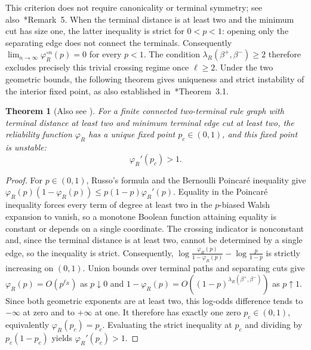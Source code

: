 \documentclass[scheme=plain,11pt]{ctexart}
\newtheorem{theorem}{Theorem}[section]
\theoremstyle{definition}
\theoremstyle{remark}
\begin{document}
This criterion does not require canonicality or terminal symmetry; see also~\cite{alves2026percolation}*{Remark~5}.
When the terminal distance is at least two and the minimum cut has size one, the latter inequality is strict for $0<p<1$: opening only the separating edge does not connect the terminals.
Consequently $\displaystyle\lim_{n\to\infty}\varphi_R^{\circ n}(p)=0$ for every $p<1$.
The condition $\lambda_R(\beta^+,\beta^-)\ge2$ therefore excludes precisely this trivial crossing regime once $\ell\ge2$.
Under the two geometric bounds, the following theorem gives uniqueness and strict instability of the interior fixed point, as also established in~\cite{alves2026percolation}*{Theorem~3.1}.

\begin{theorem}[Also see \cite{alves2026percolation}]
\label{thm:unique-unstable-critical-point}
For a finite connected two-terminal rule graph with terminal distance at least two and minimum terminal edge cut at least two, the reliability function $\varphi_R$ has a unique fixed point $p_c\in(0,1)$, and this fixed point is unstable:
\[
    \varphi_R'(p_c)>1.
\]
\end{theorem}

\begin{proof}
For $p\in(0,1)$, Russo's formula and the Bernoulli Poincar\'e inequality give $\varphi_R(p)(1-\varphi_R(p))\le p(1-p)\varphi_R'(p)$. Equality in the Poincar\'e inequality forces every term of degree at least two in the $p$-biased Walsh expansion to vanish, so a monotone Boolean function attaining equality is constant or depends on a single coordinate. The crossing indicator is nonconstant and, since the terminal distance is at least two, cannot be determined by a single edge, so the inequality is strict. Consequently, $\log\frac{\varphi_R(p)}{1-\varphi_R(p)}-\log\frac{p}{1-p}$ is strictly increasing on $(0,1)$. Union bounds over terminal paths and separating cuts give $\varphi_R(p)=O(p^{\ell_R})$ as $p\downarrow0$ and $1-\varphi_R(p)=O((1-p)^{\lambda_R(\beta^+,\beta^-)})$ as $p\uparrow1$. Since both geometric exponents are at least two, this log-odds difference tends to $-\infty$ at zero and to $+\infty$ at one. It therefore has exactly one zero $p_c\in(0,1)$, equivalently $\varphi_R(p_c)=p_c$. Evaluating the strict inequality at $p_c$ and dividing by $p_c(1-p_c)$ yields $\varphi_R'(p_c)>1$.
\end{proof}
\end{document}
